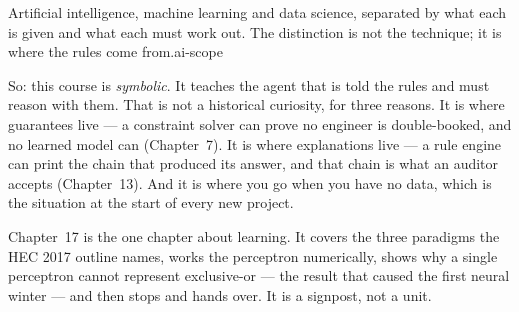 {}%
{Artificial intelligence, machine learning and data science, separated by what
each is given and what each must work out. The distinction is not the technique;
it is where the rules come from.}{ai-scope}

So: this course is \emph{symbolic}. It teaches the agent that is told the rules
and must reason with them. That is not a historical curiosity, for three reasons.
It is where guarantees live --- a constraint solver can prove no engineer is
double-booked, and no learned model can (Chapter~7). It is where explanations live
--- a rule engine can print the chain that produced its answer, and that chain is
what an auditor accepts (Chapter~13). And it is where you go when you have no
data, which is the situation at the start of every new project.

Chapter~17 is the one chapter about learning. It covers the three paradigms the
HEC 2017 outline names, works the perceptron numerically, shows why a single
perceptron cannot represent exclusive-or --- the result that caused the first
neural winter --- and then stops and hands over. It is a signpost, not a unit.

